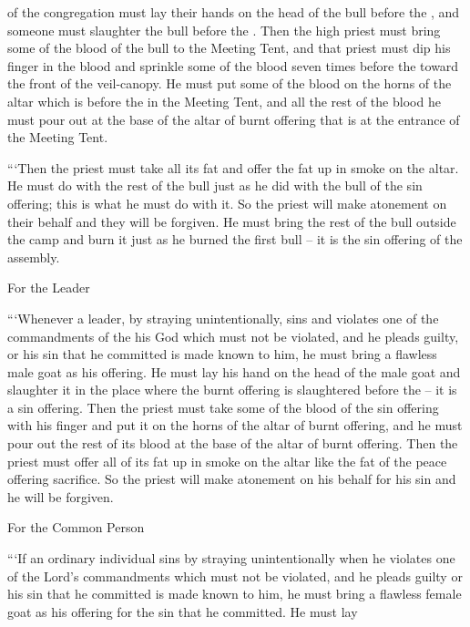 {of the congregation
must lay
their hands
on
the head
of the bull
before
the {}, and someone must slaughter
the
bull
before
the {}.
Then the high
priest
must bring
some of the blood
of the bull
to
the Meeting
Tent,
and that priest
must dip
his finger
in the blood
and sprinkle
some of the blood seven
times
before
the {}
toward the front
of the veil-canopy.
He
must put
some
of the blood
on
the horns
of the altar
which
is before
the {}
in the Meeting
Tent,
and all
the rest of the blood
he must pour
out at the base
of the altar
of burnt offering
that
is at the entrance
of the Meeting
Tent.
\par }{\PP {}“‘Then
the priest must take all
its fat
and offer
the fat
up in smoke
on the altar.
He must do
with the rest of the bull
just
as he did
with the bull
of the sin offering;
this is what
he must do
with it. So
the priest
will make
atonement
on
their behalf and they
will be forgiven.
He must bring
the rest of the bull
outside
the camp
and burn
it just
as he burned
the
first
bull
– it is
the sin offering
of the assembly.
\par }{\SH For the Leader
\par }{\PP {}“‘Whenever
a leader,
by straying unintentionally, sins
and violates
one
of the commandments
of the {}
his God
which
must not
be violated,
and he pleads
guilty,
or
his sin
that
he committed
is made known
to him,
he must bring
a flawless
male
goat
as his offering.
He must lay
his hand
on
the head
of the male goat
and slaughter
it in the
place
where
the burnt offering
is slaughtered
before
the {} –
it is
a sin offering.
Then the priest
must take
some of the blood
of the sin offering
with his finger
and put
it on
the horns
of the altar
of burnt offering,
and he must pour
out the rest of its blood
at the base
of the altar
of burnt offering.
Then the priest must offer all
of its fat
up in smoke
on the altar
like the fat
of the peace offering
sacrifice.
So the priest
will make atonement
on
his behalf for his sin
and he will be forgiven.
\par }{\SH For the Common Person
\par }{\PP {}“‘If
an ordinary individual
sins
by straying unintentionally
when he violates
one
of the Lord’s
commandments
which
must not
be violated,
and he pleads guilty
or
his sin
that
he committed
is made known
to him, he must bring
a flawless
female
goat
as his offering
for
the sin
that
he committed.
He must lay
}
